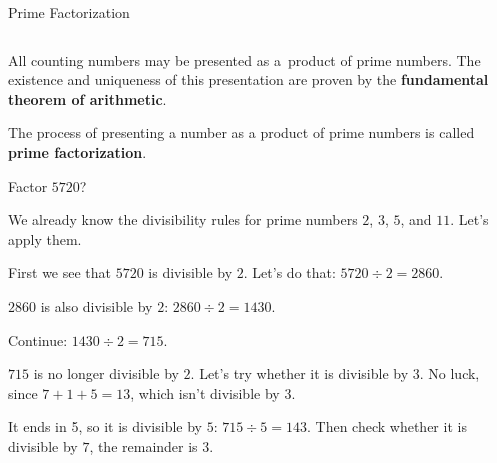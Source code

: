 \documentclass[9pt,aspectratio=169]{beamer}
\begin{document}
\begin{frame}{Prime Factorization}
  \begin{columns}[T]
    \begin{column}{0.5\textwidth}
      All counting numbers may be presented as a~product of prime numbers. The existence and uniqueness of this presentation are proven by the \textbf{fundamental theorem of arithmetic}.

      The process of presenting a number as a product of prime numbers is called \textbf{prime factorization}.
      \begin{problem}
        Factor $5720$?
      \end{problem}
      {\small
      We already know the divisibility rules for prime numbers $2$, $3$, $5$, and $11$. Let's apply them. 

      First we see that $5720$ is divisible by $2$. Let's do that:
      $5720 \div 2 = 2860$. 

      $2860$ is also divisible by $2$: $2860 \div 2 = 1430$. 

      Continue: $1430 \div 2 = 715$. 

      $715$ is no longer divisible by $2$. Let's try whether it is divisible by $3$. No luck, since $7+1+5=13$, which isn't divisible by $3$. 

      It ends in 5, so it is divisible by $5$: $715 \div 5 = 143$. 
      Then check whether it is divisible by $7$, the remainder is $3$. 
      
}
\end{column}
\end{columns}
\end{frame}
\end{document}
